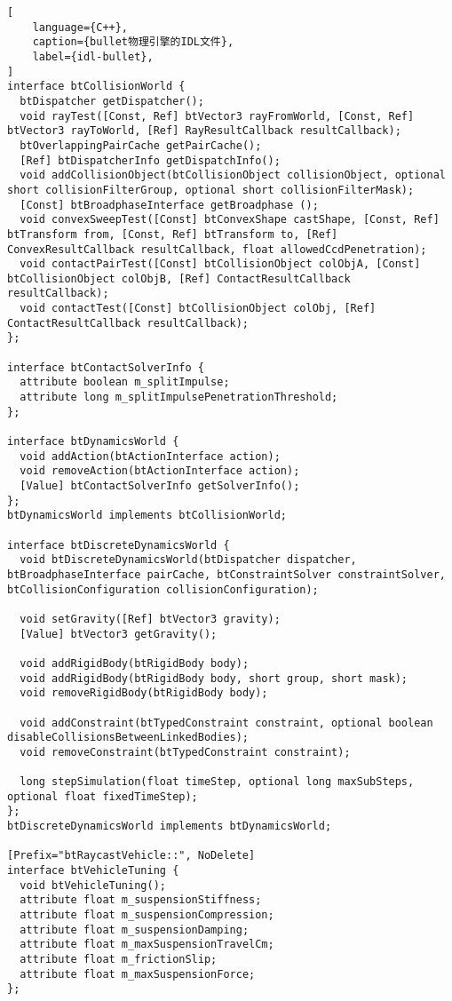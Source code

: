 \begin{lstlisting}[
    language={C++},
    caption={bullet物理引擎的IDL文件},
    label={idl-bullet},
]
interface btCollisionWorld {
  btDispatcher getDispatcher();
  void rayTest([Const, Ref] btVector3 rayFromWorld, [Const, Ref] btVector3 rayToWorld, [Ref] RayResultCallback resultCallback);
  btOverlappingPairCache getPairCache();
  [Ref] btDispatcherInfo getDispatchInfo();
  void addCollisionObject(btCollisionObject collisionObject, optional short collisionFilterGroup, optional short collisionFilterMask);
  [Const] btBroadphaseInterface getBroadphase ();
  void convexSweepTest([Const] btConvexShape castShape, [Const, Ref] btTransform from, [Const, Ref] btTransform to, [Ref] ConvexResultCallback resultCallback, float allowedCcdPenetration);
  void contactPairTest([Const] btCollisionObject colObjA, [Const] btCollisionObject colObjB, [Ref] ContactResultCallback resultCallback);
  void contactTest([Const] btCollisionObject colObj, [Ref] ContactResultCallback resultCallback);
};

interface btContactSolverInfo {
  attribute boolean m_splitImpulse;
  attribute long m_splitImpulsePenetrationThreshold;
};

interface btDynamicsWorld {
  void addAction(btActionInterface action);
  void removeAction(btActionInterface action);
  [Value] btContactSolverInfo getSolverInfo();
};
btDynamicsWorld implements btCollisionWorld;

interface btDiscreteDynamicsWorld {
  void btDiscreteDynamicsWorld(btDispatcher dispatcher, btBroadphaseInterface pairCache, btConstraintSolver constraintSolver, btCollisionConfiguration collisionConfiguration);

  void setGravity([Ref] btVector3 gravity);
  [Value] btVector3 getGravity();

  void addRigidBody(btRigidBody body);
  void addRigidBody(btRigidBody body, short group, short mask);
  void removeRigidBody(btRigidBody body);

  void addConstraint(btTypedConstraint constraint, optional boolean disableCollisionsBetweenLinkedBodies);
  void removeConstraint(btTypedConstraint constraint);

  long stepSimulation(float timeStep, optional long maxSubSteps, optional float fixedTimeStep);
};
btDiscreteDynamicsWorld implements btDynamicsWorld;

[Prefix="btRaycastVehicle::", NoDelete]
interface btVehicleTuning {
  void btVehicleTuning();
  attribute float m_suspensionStiffness;
  attribute float m_suspensionCompression;
  attribute float m_suspensionDamping;
  attribute float m_maxSuspensionTravelCm;
  attribute float m_frictionSlip;
  attribute float m_maxSuspensionForce;
};


\end{lstlisting}
